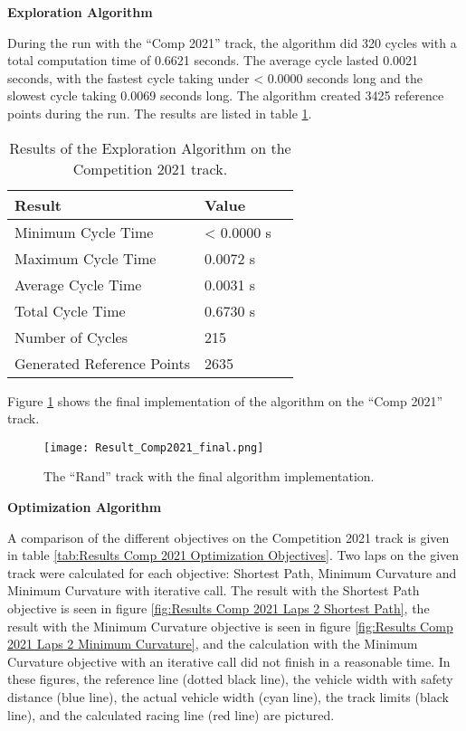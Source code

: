 \textbf{Exploration Algorithm}

During the run with the ``Comp 2021'' track, the algorithm did 320 cycles with a total computation time of 0.6621 seconds. The average cycle lasted 0.0021 seconds, with the fastest cycle taking under < 0.0000 seconds long and the slowest cycle taking 0.0069 seconds long. The algorithm created 3425 reference points during the run. The results are listed in table \ref{tab:Results Comp 2021 Exploration}.

\begin{table}[H]
    \centering
    \begin{tabular}{|l|l|l|}
        \hline
        \textbf{Result}            & \textbf{Value} \\ \hline
        Minimum Cycle Time         & < 0.0000 s     \\ \hline
        Maximum Cycle Time         & 0.0072 s       \\ \hline
        Average Cycle  Time        & 0.0031 s       \\ \hline
        Total Cycle Time           & 0.6730 s       \\ \hline
        Number of Cycles           & 215            \\ \hline
        Generated Reference Points & 2635           \\ \hline
    \end{tabular}
    \caption{Results of the Exploration Algorithm on the Competition 2021 track.}
    \label{tab:Results Comp 2021 Exploration}
\end{table}

Figure \ref{fig:Result Comp 2021 Final} shows the final implementation of the algorithm on the ``Comp 2021'' track.
\begin{figure}[H]
    \centering
    \texttt{[image: Result\_Comp2021\_final.png]}
    \caption{The ``Rand'' track with the final algorithm implementation.}
    \label{fig:Result Comp 2021 Final}
\end{figure}

\textbf{Optimization Algorithm}

A comparison of the different objectives on the Competition 2021 track is given in table \ref{tab:Results Comp 2021 Optimization Objectives}. Two laps on the given track were calculated for each objective: Shortest Path, Minimum Curvature and Minimum Curvature with iterative call. The result with the Shortest Path objective is seen in figure \ref{fig:Results Comp 2021 Laps 2 Shortest Path}, the result with the Minimum Curvature objective is seen in figure \ref{fig:Results Comp 2021 Laps 2 Minimum Curvature}, and the calculation with the Minimum Curvature objective with an iterative call did not finish in a reasonable time. In these figures, the reference line (dotted black line), the vehicle width with safety distance (blue line), the actual vehicle width (cyan line), the track limits (black line), and the calculated racing line (red line) are pictured.

